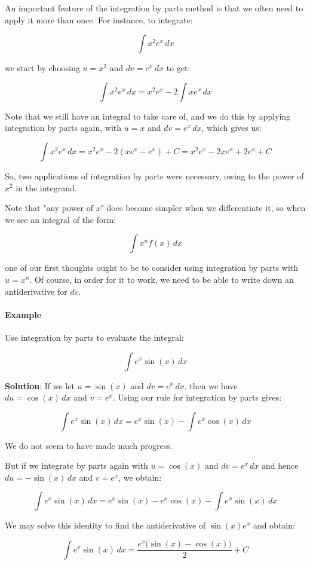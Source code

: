 An important feature of the integration by parts method is that we often need to apply it more than once. For instance, to integrate:

$$\int x^2 e^x \, dx$$

we start by choosing $u = x^2$ and $dv = e^x \, dx$ to get:

$$\int x^2 e^x \, dx = x^2 e^x - 2 \int x e^x \, dx$$

Note that we still have an integral to take care of, and we do this by applying integration by parts again, with $u = x$ and $dv = e^x \, dx$, which gives us:

$$\int x^2 e^x \, dx = x^2 e^x - 2(xe^x - e^x) + C = x^2 e^x - 2xe^x + 2e^x + C$$

So, two applications of integration by parts were necessary, owing to the power of $x^2$ in the integrand.

Note that "any power of $x$" does become simpler when we differentiate it, so when we see an integral of the form:

$$\int x^n f(x) \, dx$$

one of our first thoughts ought to be to consider using integration by parts with $u = x^n$. Of course, in order for it to work, we need to be able to write down an antiderivative for $dv$.

\paragraph{Example}

Use integration by parts to evaluate the integral:

$$\int e^x \sin(x) \, dx$$

\textbf{Solution}: If we let $u = \sin(x)$ and $dv = e^x \, dx$, then we have $du = \cos(x) \, dx$ and $v = e^x$. Using our rule for integration by parts gives:

$$\int e^x \sin(x) \, dx = e^x \sin(x) - \int e^x \cos(x) \, dx$$

We do not seem to have made much progress.

But if we integrate by parts again with $u = \cos(x)$ and $dv = e^x \, dx$ and hence $du = -\sin(x) \, dx$ and $v = e^x$, we obtain:

$$\int e^x \sin(x) \, dx = e^x \sin(x) - e^x \cos(x) - \int e^x \sin(x) \, dx$$

We may solve this identity to find the antiderivative of $\sin(x) e^x$ and obtain:

$$\int e^x \sin(x) \, dx = \frac{e^x \big(\sin(x) - \cos(x)\big)}{2} + C$$

